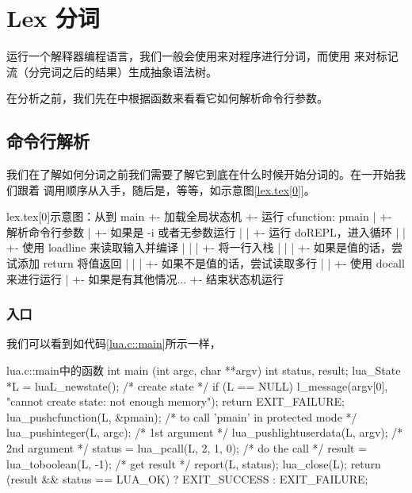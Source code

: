 

\chapter{Lex 分词}

运行一个解释器编程语言，我们一般会使用来对程序进行分词，而使用%
来对标记流（分完词之后的结果）生成抽象语法树。

在分析之前，我们先在中根据函数来看看它如何解析命令行参数。


\section{命令行解析}

我们在了解如何分词之前我们需要了解它到底在什么时候开始分词的。在一开始我们跟着
调用顺序从入手，随后是，等等，如示意图\ref{lex.tex[0]}。

\begin{code}{lex.tex[0]}{示意图：从到}
main
 +- 加载全局状态机
 +- 运行 cfunction: pmain
 |   +- 解析命令行参数
 |   +- 如果是 -i 或者无参数运行
 |   |   +- 运行 doREPL，进入循环
 |   |       +- 使用 loadline 来读取输入并编译
 |   |       |   +- 将一行入栈
 |   |       |   +- 如果是值的话，尝试添加 return 将值返回
 |   |       |   +- 如果不是值的话，尝试读取多行
 |   |       +- 使用 docall 来进行运行
 |   +- 如果是有其他情况...
 +- 结束状态机运行
\end{code}


\subsection{入口}

我们可以看到如代码\ref{lua.c::main}所示一样，

\begin{ccode}{lua.c::main}{中的函数}
int main (int argc, char **argv) {
  int status, result;
  lua_State *L = luaL_newstate();  /* create state */
  if (L == NULL) {
    l_message(argv[0], "cannot create state: not enough memory");
    return EXIT_FAILURE;
  }
  lua_pushcfunction(L, &pmain);  /* to call 'pmain' in protected mode */
  lua_pushinteger(L, argc);  /* 1st argument */
  lua_pushlightuserdata(L, argv); /* 2nd argument */
  status = lua_pcall(L, 2, 1, 0);  /* do the call */
  result = lua_toboolean(L, -1);  /* get result */
  report(L, status);
  lua_close(L);
  return (result && status == LUA_OK) ? EXIT_SUCCESS : EXIT_FAILURE;
}
\end{ccode}

